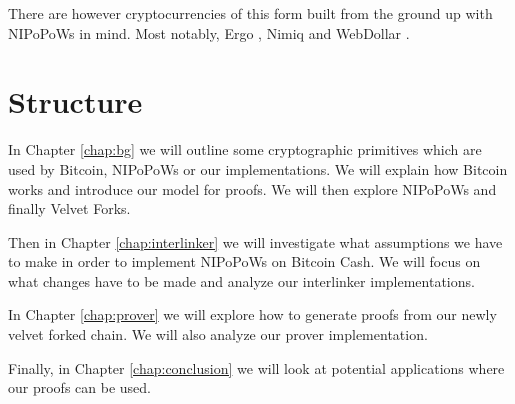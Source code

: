 There are however cryptocurrencies of this form built from the ground up with NIPoPoWs in mind. Most notably, Ergo \cite{ergo}, Nimiq \cite{nimiq} and WebDollar \cite{webdollar}.

\section{Structure}
In Chapter \ref{chap:bg} we will outline some cryptographic primitives which are used by Bitcoin, NIPoPoWs or our implementations. We will explain how Bitcoin works and introduce our model for proofs. We will then explore NIPoPoWs and finally Velvet Forks.

Then in Chapter \ref{chap:interlinker} we will investigate what assumptions we have to make in order to implement NIPoPoWs on Bitcoin Cash. We will focus on what changes have to be made and analyze our interlinker implementations.

In Chapter \ref{chap:prover} we will explore how to generate proofs from our newly velvet forked chain. We will also analyze our prover implementation.

Finally, in Chapter \ref{chap:conclusion} we will look at potential applications where our proofs can be used.
